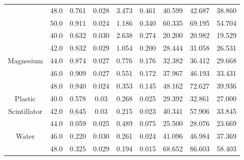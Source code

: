 \begin{tabularx}{1.27\textwidth}{CCCCCCCCC}
    & 48.0 &    0.761 &         0.028 &                  3.473 &                       0.461 &                  40.599 &                      42.687 &                      38.860 \\
    & 50.0 &    0.911 &         0.024 &                  1.186 &                       0.340 &                  60.335 &                      69.195 &                      54.704 \\
    \midrule
    & 40.0 &    0.632 &         0.030 &                  2.638 &                       0.274 &                  20.200 &                      20.982 &                      19.529 \\
    & 42.0 &    0.832 &         0.029 &                  1.054 &                       0.200 &                  28.444 &                      31.058 &                      26.531 \\
    Magnesium& 44.0 &    0.874 &         0.027 &                  0.776 &                       0.176 &                  32.382 &                      36.412 &                      29.668 \\
    & 46.0 &    0.909 &         0.027 &                  0.551 &                       0.172 &                  37.967 &                      46.193 &                      33.431 \\
    & 48.0 &    0.940 &         0.024 &                  0.353 &                       0.145 &                  48.162 &                      72.627 &                      39.936 \\
    \midrule
    Plastic& 40.0 &    0.578 &          0.03 &                  0.268 &                       0.025 &                  29.392 &                      32.861 &                      27.000 \\
    Scintillator& 42.0 &    0.645 &          0.03 &                  0.215 &                       0.023 &                  40.341 &                      57.906 &                      33.845 \\
    \midrule
    & 44.0 &    0.059 &         0.025 &                  0.489 &                       0.075 &                  25.500 &                      28.076 &                      23.669 \\
    Water & 46.0 &    0.220 &         0.030 &                  0.261 &                       0.024 &                  41.096 &                      46.984 &                      37.369 \\
    & 48.0 &    0.325 &         0.029 &                  0.194 &                       0.015 &                  68.652 &                      86.603 &                      58.403 \\
    \bottomrule
\end{tabularx}